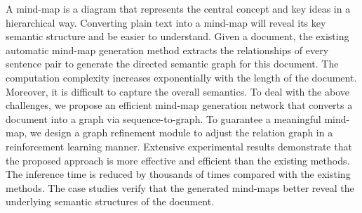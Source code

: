 A mind-map is a diagram that represents the central concept and key ideas in a hierarchical way. Converting plain text into a mind-map will reveal its key semantic structure and be easier to understand. Given a document, the existing automatic mind-map generation method extracts the relationships of every sentence pair to generate the directed semantic graph for this document. The computation complexity increases exponentially with the length of the document. Moreover, it is difficult to capture the overall semantics. To deal with the above challenges, we propose an efficient mind-map generation network that converts a document into a graph via sequence-to-graph. To guarantee a meaningful mind-map, we design a graph refinement module to adjust the relation graph in a reinforcement learning manner. Extensive experimental results demonstrate that the proposed approach is more effective and efficient than the existing methods. The inference time is reduced by thousands of times compared with the existing methods. The case studies verify that the generated mind-maps better reveal the underlying semantic structures of the document.
